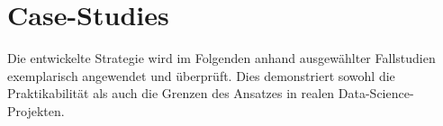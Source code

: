 \chapter{Case-Studies} \label{sec:case_studies}

Die entwickelte Strategie wird im Folgenden anhand ausgewählter Fallstudien exemplarisch angewendet und überprüft.
Dies demonstriert sowohl die Praktikabilität als auch die Grenzen des Ansatzes in realen Data-Science-Projekten.





